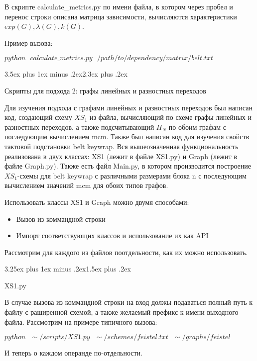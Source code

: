 \documentclass[a4paper,12pt]{report}
\makeatletter
\theoremstyle{plain} %
\theoremstyle{definition}
\theoremstyle{remark}
\renewcommand{\section}{\@startsection{section}{1}{18pt}%
{3.5ex plus 1ex minus .2ex}{2.3ex plus .2ex}%
{\normalfont\Large\bfseries\raggedright}}%
\renewcommand{\subsection}{\@startsection{subsection}{2}{18pt}%
{3.25ex plus 1ex minus .2ex}{1.5ex plus .2ex}%
{\normalfont\large\bfseries\raggedright}}%
\makeatother
\begin{document}
\begin{large}
В скрипте calculate\_metrics.py по имени файла, в котором через пробел и перенос строки описана матрица зависимости, вычисляются характеристики $exp(G), \lambda(G), k(G)$.

Пример вызова:

$python~~~calculate\_metrics.py~~~/path/to/dependency/matrix/belt.txt$

\section{Скрипты для подхода 2: графы линейных и разностных переходов}

Для изучения подхода с графами линейных и разностных переходов был написан код, создающий схему $XS_1$ из файла, вычисляющий по схеме графы линейных и разностных переходов, а также подсчитывающий $\Pi_N$ по обоим графам с последующим вычислением mcm. Также был написан код для изучения свойств тактовой подстановки belt keywrap. Вся вышеозначенная функциональность реализована в двух классах: XS1 (лежит в файле XS1.py) и Graph (лежит в файле Graph.py). Также есть файл Main.py, в котором производится построение $XS_1$-схемы для belt keywrap с различными размерами блока n с последующим вычислением значений mcm для обоих типов графов. 

 Использовать классы XS1 и Graph можно двумя способами:

\begin{itemize}
\item Вызов из коммандной строки
\item Импорт соответствующих классов и использование их как API
\end{itemize}

Рассмотрим для каждого из файлов поотдельности, как их можно использовать.

\subsection{XS1.py}

В случае вызова из коммандной строки на вход должы подаваться полный путь к файлу с раширенной схемой, а также желаемый префикс к имени выходного файла. Рассмотрим на примере типичного вызова:

$python ~~~\sim/scripts/XS1.py~~~ \sim/schemes/feistel.txt~~~ \sim/graphs/feistel$

И теперь о каждом операнде по-отдельности.


\end{large}
\end{document}
